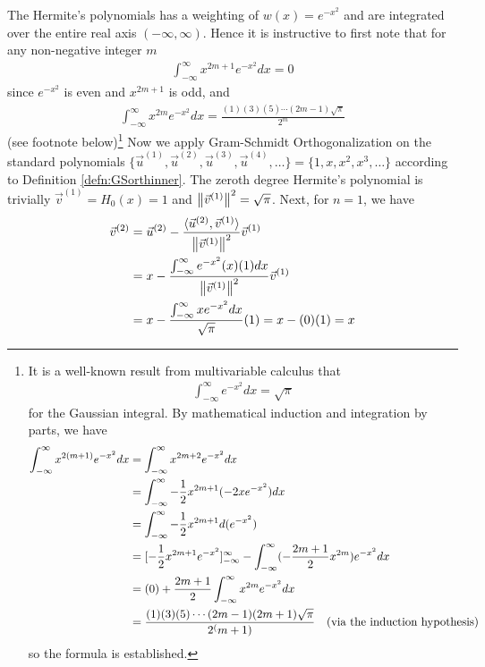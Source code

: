 \begin{solution}
The Hermite's polynomials has a weighting of $w(x) = e^{-x^2}$ and are integrated over the entire real axis $(-\infty, \infty)$. Hence it is instructive to first note that for any non-negative integer $m$
\begin{align*}
\int_{-\infty}^{\infty} x^{2m+1}e^{-x^2} dx = 0
\end{align*}
since $e^{-x^2}$ is even and $x^{2m+1}$ is odd, and
\begin{align*}
\int_{-\infty}^{\infty} x^{2m}e^{-x^2} dx = \frac{(1)(3)(5)\cdots(2m-1)\sqrt{\pi}}{2^m}
\end{align*}
(see footnote below)\footnote{It is a well-known result from multivariable calculus that
\begin{align*}
\int_{-\infty}^{\infty} e^{-x^2} dx = \sqrt{\pi}
\end{align*}
for the Gaussian integral. By mathematical induction and integration by parts, we have
\begin{align*}
\int_{-\infty}^{\infty} x^{2(m+1)}e^{-x^2} dx &= \int_{-\infty}^{\infty} x^{2m+2}e^{-x^2} dx \\
&= \int_{-\infty}^{\infty} -\frac{1}{2}x^{2m+1} (-2xe^{-x^2}) dx \\
&= \int_{-\infty}^{\infty} -\frac{1}{2}x^{2m+1} d(e^{-x^2}) \\
&= [-\frac{1}{2}x^{2m+1}e^{-x^2}]_{-\infty}^{\infty} - \int_{-\infty}^{\infty} (-\frac{2m+1}{2}x^{2m})e^{-x^2} dx \\
&= (0) + \frac{2m+1}{2} \int_{-\infty}^{\infty} x^{2m}e^{-x^2} dx \\
&= \frac{(1)(3)(5)\cdots(2m-1)(2m+1)\sqrt{\pi}}{2^(m+1)} \text{\quad (via the induction hypothesis)}
\end{align*}
so the formula is established.}
Now we apply Gram-Schmidt Orthogonalization on the standard polynomials $\{\vec{u}^{(1)}, \vec{u}^{(2)}, \vec{u}^{(3)}, \vec{u}^{(4)}, \ldots\} = \{1, x, x^2, x^3, \ldots\}$ according to Definition \ref{defn:GSorthinner}. The zeroth degree Hermite's polynomial is trivially $\vec{v}^{(1)} = H_0(x) = 1$ and $\norm{\vec{v}^{(1)}}^2 = \sqrt{\pi}$. Next, for $n=1$, we have
\begin{align*}
\vec{v}^{(2)} &= \vec{u}^{(2)} - \frac{\langle \vec{u}^{(2)}, \vec{v}^{(1)}\rangle}{\norm{\vec{v}^{(1)}}^2} \vec{v}^{(1)} \\
&= x - \frac{\int_{-\infty}^{\infty} e^{-x^2}(x)(1) dx}{\norm{\vec{v}^{(1)}}^2} \vec{v}^{(1)} \\
&= x - \frac{\int_{-\infty}^{\infty} xe^{-x^2} dx}{\sqrt{\pi}} (1) = x - (0)(1) = x

\end{align*}
\end{solution}
